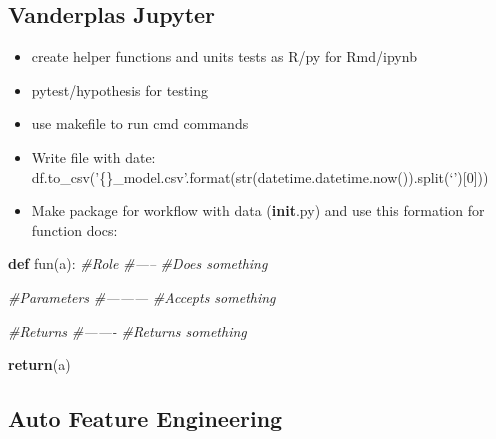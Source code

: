 \documentclass[]{book}
\newenvironment{Shaded}{\begin{snugshade}}{\end{snugshade}}
\newcommand{\KeywordTok}[1]{\textcolor[rgb]{0.13,0.29,0.53}{\textbf{#1}}}
\newcommand{\CommentTok}[1]{\textcolor[rgb]{0.56,0.35,0.01}{\textit{#1}}}
\newcommand{\ControlFlowTok}[1]{\textcolor[rgb]{0.13,0.29,0.53}{\textbf{#1}}}
\newcommand{\NormalTok}[1]{#1}
\theoremstyle{definition}
\theoremstyle{definition}
\theoremstyle{definition}
\theoremstyle{remark}
\begin{document}
\subsection{Vanderplas Jupyter}\label{vanderplas-jupyter}

\begin{itemize}
\item
  create helper functions and units tests as R/py for Rmd/ipynb
\item
  pytest/hypothesis for testing
\item
  use makefile to run cmd commands
\item
  Write file with date:
  df.to\_csv('\{\}\_model.csv'.format(str(datetime.datetime.now()).split(`'){[}0{]}))
\item
  Make package for workflow with data (\textbf{init}.py) and use this
  formation for function docs:
\end{itemize}

\begin{Shaded}
\begin{Highlighting}[]
\KeywordTok{def}\NormalTok{ fun(a):}
  \CommentTok{#Role}
  \CommentTok{#-----}
  \CommentTok{#Does something}
  
  \CommentTok{#Parameters}
  \CommentTok{#---------}
  \CommentTok{#Accepts something}
  
  \CommentTok{#Returns}
  \CommentTok{#-------}
  \CommentTok{#Returns something}
  
  \ControlFlowTok{return}\NormalTok{(a)}
\end{Highlighting}
\end{Shaded}

\subsection{Auto Feature Engineering}\label{auto-feature-engineering}
\end{document}
